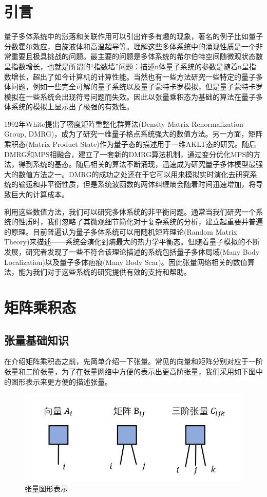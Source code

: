 \documentclass[12pt]{article}
\begin{document}
	\newpage
	{\centering\section{引言}}
	量子多体系统中的涨落和关联作用可以引出许多有趣的现象，著名的例子比如量子分数霍尔效应，自旋液体和高温超导等。理解这些多体系统中的涌现性质是一个非常重要且极具挑战的问题。最主要的问题是多体系统的希尔伯特空间随微观状态数呈指数增长，也就是所谓的“指数墙”问题：描述n体量子系统的参数是随着n呈指数增长，超出了如今计算机的计算性能。当然也有一些方法研究一些特定的量子多体问题，例如一些完全可解的量子系统以及量子蒙特卡罗模拟，但是量子蒙特卡罗模拟在一些系统会出现符号问题而失效。因此以张量乘积态为基础的算法在量子多体系统的模拟上显示出了极强的有效性。
	
	1992年White提出了密度矩阵重整化群算法(Density Matrix Renormalization Group, DMRG)，成为了研究一维量子格点系统强大的数值方法。另一方面，矩阵乘积态(Matrix Product State)作为量子态的描述用于一维AKLT态的研究。随后DMRG和MPS相融合，建立了一套新的DMRG算法机制，通过变分优化MPS的方法，得到系统的基态。随后相关的算法不断涌现，迅速成为研究量子多体模型最强大的数值方法之一。DMRG的成功之处还在于它可以用来模拟实时演化去研究系统的输运和非平衡性质，但是系统波函数的两体纠缠熵会随着时间迅速增加，将导致巨大的计算成本。
	
	利用这些数值方法，我们可以研究多体系统的非平衡问题。通常当我们研究一个系统的性质时，我们忽略了其微观细节简化对于复杂系统的分析，建立起重要并普遍的原理。目前普遍认为量子多体系统可以用随机矩阵理论(Random Matrix Theory)来描述——系统会演化到熵最大的热力学平衡态。但随着量子模拟的不断发展，研究者发现了一些不符合该理论描述的系统包括量子多体局域(Many Body Localization)以及量子多体疤痕(Many Body Scar)\cite{papic2021weak}。因此张量网络相关的数值算法，能为我们对于这些系统的研究提供有效的支持和帮助。
	\newpage
	

	{\centering\section{矩阵乘积态}}
	   \subsection{张量基础知识}
	   在介绍矩阵乘积态之前，先简单介绍一下张量。常见的向量和矩阵分别对应于一阶张量和二阶张量，为了在张量网络中方便的表示出更高阶张量，我们采用如下图中的图形表示来更方便的描述张量。
	   \begin{figure}[H]
	   	\centering
	   	\includegraphics[scale=0.7]{1.张量图形表示}
	   	\caption[10.5pt]{ 张量图形表示}
	   	\label{fig:1}
	   \end{figure}
   
\end{document}
